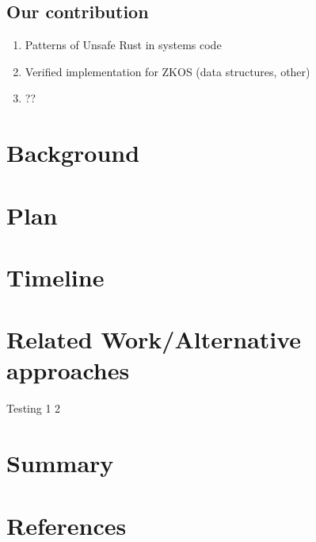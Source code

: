 \documentclass{article}
\begin{document}
\subsection{Our contribution}
\begin{enumerate}
    \item Patterns of Unsafe Rust in systems code
    \item Verified implementation for ZKOS (data structures, other)
    \item ??
\end{enumerate}

\section{Background}

\section{Plan}

\section{Timeline}

\section{Related Work/Alternative approaches}
Testing 1 2

\section{Summary}

\section{References}
\end{document}
